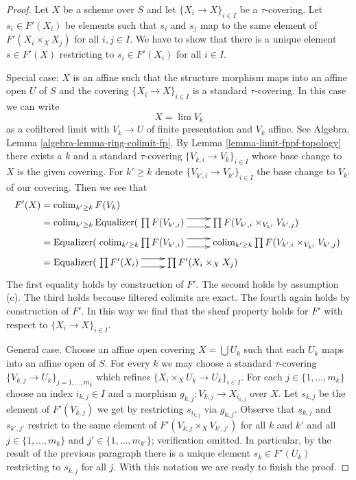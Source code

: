 \documentclass{stacks-project}
\theoremstyle{plain}
\theoremstyle{definition}
\theoremstyle{remark}
\numberwithin{equation}{subsection}
\def\lim{\mathop{\mathrm{lim}}\nolimits}
\def\colim{\mathop{\mathrm{colim}}\nolimits}
\begin{document}
\begin{proof}
Let $X$ be a scheme over $S$ and let $\{X_i \to X\}_{i \in I}$
be a $\tau$-covering. Let $s_i \in F'(X_i)$ be elements such that
$s_i$ and $s_j$ map to the same element of $F'(X_i \times_X X_j)$
for all $i, j \in I$. We have to show that there is a
unique element $s \in F'(X)$ restricting to $s_i \in F'(X_i)$ for all $i \in I$.

\medskip\noindent
Special case: $X$ is an affine such that the structure morphism
maps into an affine open $U$ of $S$ and the covering
$\{X_i \to X\}_{i \in I}$ is a standard $\tau$-covering.
In this case we can write
$$
X = \lim V_k
$$
as a cofiltered limit with $V_k \to U$ of finite presentation
and $V_k$ affine. See Algebra, Lemma \ref{algebra-lemma-ring-colimit-fp}.
By Lemma \ref{lemma-limit-fppf-topology} there exists a $k$ and a standard
$\tau$-covering $\{V_{k, i} \to V_k\}_{i \in I}$ whose base change
to $X$ is the given covering. For $k' \geq k$ denote
$\{V_{k', i} \to V_{k'}\}_{i \in I}$ the base change to $V_{k'}$
of our covering. Then we see that
\begin{align*}
F'(X)
& =
\colim_{k' \geq k} F(V_k) \\
& =
\colim_{k' \geq k}
\text{Equalizer}(
\xymatrix{
\prod F(V_{k', i})
\ar@<1ex>[r] \ar@<-1ex>[r] &
\prod F(V_{k', i} \times_{V_{k'}} V_{k', j})
}
\\
& =
\text{Equalizer}(
\xymatrix{
\colim_{k' \geq k}
\prod F(V_{k', i})
\ar@<1ex>[r] \ar@<-1ex>[r] &
\colim_{k' \geq k}
\prod F(V_{k', i} \times_{V_{k'}} V_{k', j})
}
\\
& =
\text{Equalizer}(
\xymatrix{
\prod F'(X_i)
\ar@<1ex>[r] \ar@<-1ex>[r] &
\prod F'(X_i \times_X X_j)
}
\end{align*}
The first equality holds by construction of $F'$. The second holds by
assumption (c). The third holds because filtered colimits are exact.
The fourth again holds by construction of $F'$.
In this way we find that the sheaf property holds for $F'$
with respect to $\{X_i \to X\}_{i \in I}$.

\medskip\noindent
General case. Choose an affine open covering $X = \bigcup U_k$ such that
each $U_k$ maps into an affine open of $S$. For every $k$ we may choose
a standard $\tau$-covering $\{V_{k, j} \to U_k\}_{j = 1, \ldots, m_k}$
which refines $\{X_i \times_X U_k \to U_k\}_{i \in I}$. For each
$j \in \{1, \ldots, m_k\}$ choose an index $i_{k, j} \in I$
and a morphism $g_{k, j} : V_{k, j} \to X_{i_{k, j}}$ over $X$.
Let $s_{k, j}$ be the element of $F'(V_{k, j})$ we get by restricting
$s_{i_{k, j}}$ via $g_{k, j}$. Observe that $s_{k, j}$ and $s_{k', j'}$
restrict to the same element of $F'(V_{k, j} \times_X V_{k', j'})$
for all $k$ and $k'$ and all $j \in \{1, \ldots, m_k\}$
and $j' \in \{1, \ldots, m_{k'}\}$; verification omitted.
In particular, by the result of the previous paragraph there is a unique
element $s_k \in F'(U_k)$ restricting to $s_{k, j}$ for all $j$.
With this notation we are ready to finish the proof.


\end{proof}
\end{document}
